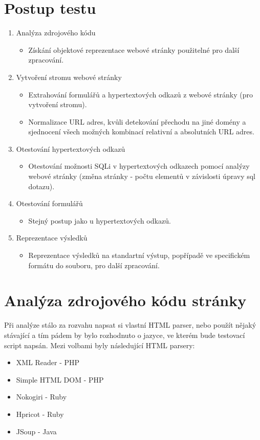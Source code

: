 \documentclass[12pt, a4paper]{report}
\begin{document}
\section{Postup testu}
\begin{enumerate}
\item Analýza zdrojového kódu 
\begin{itemize}
\item Získání objektové reprezentace webové stránky použitelné pro další zpracování.
\end{itemize}
\item Vytvoření stromu webové stránky
\begin{itemize}
\item Extrahování formulářů a hypertextových odkazů z webové stránky (pro vytvoření stromu).
\item Normalizace URL adres, kvůli detekování přechodu na jiné domény a sjednocení všech možných kombinací relativní a absolutních URL adres.
\end{itemize}
\item Otestování hypertextových odkazů
\begin{itemize}
\item Otestování možnosti SQLi v hypertextových odkazech pomocí analýzy webové stránky (změna stránky - počtu elementů v závislosti úpravy sql dotazu).
\end{itemize}
\item Otestování formulářů
\begin{itemize}
\item Stejný postup jako u hypertextových odkazů.
\end{itemize}
\item Reprezentace výsledků
\begin{itemize}
\item Reprezentace výsledků na standartní výstup, popřípadě ve specifickém formátu do souboru, pro další zpracování.
\end{itemize}
\end{enumerate}

\section{Analýza zdrojového kódu stránky}
Při analýze stálo za rozvahu napsat si vlastní HTML parser, nebo použít nějaký stávající a tím pádem by bylo rozhodnuto o jazyce, ve kterém bude testovací script napsán. Mezi volbami byly následující HTML parsery:
\begin{itemize}
\item XML Reader - PHP
\item Simple HTML DOM - PHP
\item Nokogiri - Ruby
\item Hpricot - Ruby
\item JSoup - Java
\end{itemize}
\end{document}
